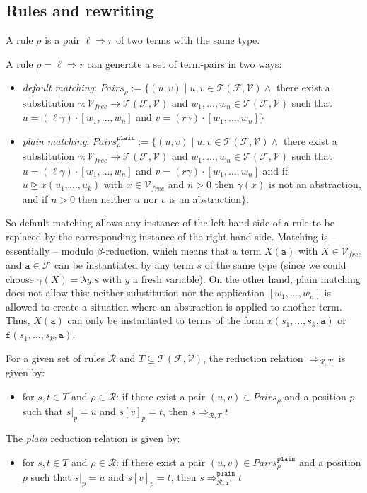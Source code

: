 \documentclass{lmcs}
\theoremstyle{theorem}\newtheorem{theorem}[dummy]{Theorem}
\theoremstyle{theorem}\newtheorem{lemma}[dummy]{Lemma}
\theoremstyle{theorem}\newtheorem{corollary}[dummy]{Corollary}
\theoremstyle{definition}\newtheorem{definition}[dummy]{Definition}
\theoremstyle{definition}\newtheorem{example}[dummy]{Example}
\newcommand{\F}{\mathcal{F}}
\newcommand{\V}{\mathcal{V}}
\newcommand{\Vfree}{\mathcal{V}_{\mathit{free}}}
\newcommand{\Terms}{\mathcal{T}}
\newcommand{\Rules}{\mathcal{R}}
\newcommand{\identifier}[1]{\mathtt{#1}}
\newcommand{\afun}{\identifier{f}}
\newcommand{\abs}[2]{\lambda #1.#2}
\newcommand{\arrz}{\Rightarrow}
\newcommand{\arr}[1]{\arrz_{#1}}
\newcommand{\suptermeq}{\unrhd}
\begin{document}
\subsection{Rules and rewriting}

A rule $\rho$ is a pair $\ell \arrz r$ of two terms with the same type.

A rule $\rho = \ell \arrz r$ can generate a set of term-pairs in two ways:
\begin{itemize}
\item \emph{default matching}: $\mathit{Pairs}_\rho := \{ (u,v) \mid u,v \in \Terms(\F,\V) \wedge$
  there exist a substitution $\gamma : \Vfree \to \Terms(\F,\V)$ and $w_1,\dots,w_n \in
  \Terms(\F,\V)$ such that $u = (\ell\gamma) \cdot [w_1,\dots,w_n]$ and
  $v = (r\gamma) \cdot [w_1,\dots,w_n] \}$
\item \emph{plain matching}: $\mathit{Pairs}_\rho^{\mathtt{plain}} := \{ (u,v) \mid u,v \in
  \Terms(\F,\V) \wedge$ there exist a substitution $\gamma : \Vfree \to \Terms(\F,\V)$ and $w_1,
  \dots,w_n \in \Terms(\F,\V)$ such that $u = (\ell\gamma) \cdot [w_1,\dots,w_n]$ and
  $v = (r\gamma) \cdot [w_1,\dots,w_n]$ and if $u \suptermeq x(u_1,\dots,u_k)$ with $x \in
  \Vfree$ and $n > 0$ then $\gamma(x)$ is not an abstraction, and if $n > 0$ then neither
  $u$ nor $v$ is an abstraction$\}$.
\end{itemize}
So default matching allows any instance of the left-hand side of a rule to be replaced by the
corresponding instance of the right-hand side. Matching is -- essentially -- modulo
$\beta$-reduction, which means that a term $X(\mathtt{a})$ with $X \in \Vfree$ and
$\mathtt{a} \in \F$ can be instantiated by any term $s$ of the same type (since we could
choose $\gamma(X) = \abs{y}{s}$ with $y$ a fresh variable).
On the other hand, plain matching does not allow this: neither substitution nor the
application $[w_1,\dots,w_n]$ is allowed to create a situation where an abstraction is applied
to another term. Thus, $X(\mathtt{a})$ can only be instantiated to terms of the form
$x(s_1,\dots,s_k,\mathtt{a})$ or $\afun(s_1,\dots,s_k,\mathtt{a})$.

For a given set of rules $\Rules$ and $T \subseteq \Terms(\F,\V)$, the reduction relation
$\arr{\Rules,T}$ is given by:
\begin{itemize}
\item for $s,t \in T$ and $\rho \in \Rules$: if there exist a pair $(u,v) \in
  \mathit{Pairs}_{\rho}$ and a position $p$ such that
  $s|_p = u$ and $s[v]_p = t$, then $s \arr{\Rules,T} t$
\end{itemize}
The \emph{plain} reduction relation is given by:
\begin{itemize}
\item for $s,t \in T$ and $\rho \in \Rules$: if there exist a pair $(u,v) \in
  \mathit{Pairs}_{\rho}^{\mathtt{plain}}$ and a position $p$ such that
  $s|_p = u$ and $s[v]_p = t$, then $s \arr{\Rules,T}^{\mathtt{plain}} t$
\end{itemize}
\end{document}
